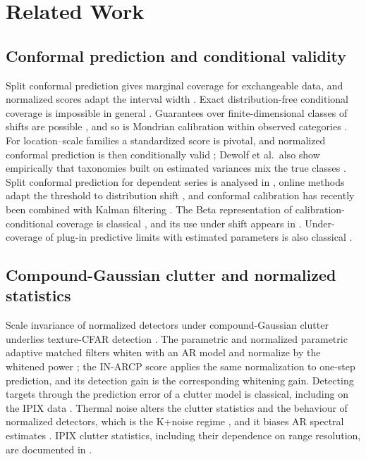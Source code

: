 \documentclass[journal]{IEEEtran}
\begin{document}
\section{Related Work}
\subsection{Conformal prediction and conditional validity}
Split conformal prediction gives marginal coverage for exchangeable data, and normalized scores adapt the interval width \cite{lei2018}. Exact distribution-free conditional coverage is impossible in general \cite{barber2021limits}. Guarantees over finite-dimensional classes of shifts are possible \cite{gibbs2025}, and so is Mondrian calibration within observed categories \cite{vovk2012,bostrom2020}. For location--scale families a standardized score is pivotal, and normalized conformal prediction is then conditionally valid \cite{dewolf2025}; Dewolf et al.\ also show empirically that taxonomies built on estimated variances mix the true classes \cite[\S5.2]{dewolf2025}. Split conformal prediction for dependent series is analysed in \cite{barber2023,barber2026,zhai2026}, online methods adapt the threshold to distribution shift \cite{gibbs2021aci,xu2023spci}, and conformal calibration has recently been combined with Kalman filtering \cite{weisman2026ckf}. The Beta representation of calibration-conditional coverage is classical \cite{vovk2012}, and its use under shift appears in \cite{ramos2026}. Under-coverage of plug-in predictive limits with estimated parameters is also classical \cite{barndorff1996,lawless2005,vidoni2009}.

\subsection{Compound-Gaussian clutter and normalized statistics}
Scale invariance of normalized detectors under compound-Gaussian clutter underlies texture-CFAR detection \cite{conte1995,kraut1999,ollila2012,sangston2012}. The parametric and normalized parametric adaptive matched filters whiten with an AR model and normalize by the whitened power \cite{roman2000,michels2000}; the IN-ARCP score applies the same normalization to one-step prediction, and its detection gain is the corresponding whitening gain. Detecting targets through the prediction error of a clutter model is classical, including on the IPIX data \cite{haykin1995}. Thermal noise alters the clutter statistics and the behaviour of normalized detectors, which is the K+noise regime \cite{watts1987,gini1997,watts2007cfarloss,ward2013}, and it biases AR spectral estimates \cite{kay1980}. IPIX clutter statistics, including their dependence on range resolution, are documented in \cite{farina1997,conte2004resolution}.
\end{document}

